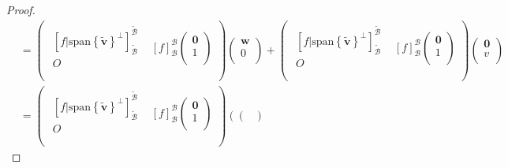 \documentclass[dvipdfmx]{jsarticle}
\begin{document}
\begin{proof}
\begin{align*}
&= \begin{pmatrix}
\begin{matrix}
\left[ f|{{\mathrm{span}}\left\{ \widetilde{\mathbf{v}} \right\}}^{\bot} \right]_{\widetilde{\mathcal{B}}}^{\widetilde{\mathcal{B}}} \\
O \\
\end{matrix} & [ f]_{\mathcal{B}}^{\mathcal{B}}\begin{pmatrix}
\mathbf{0} \\
1 \\
\end{pmatrix} \\
\end{pmatrix}\begin{pmatrix}
\mathbf{w} \\
0 \\
\end{pmatrix} + \begin{pmatrix}
\begin{matrix}
\left[ f|{{\mathrm{span}}\left\{ \widetilde{\mathbf{v}} \right\}}^{\bot} \right]_{\widetilde{\mathcal{B}}}^{\widetilde{\mathcal{B}}} \\
O \\
\end{matrix} & [ f]_{\mathcal{B}}^{\mathcal{B}}\begin{pmatrix}
\mathbf{0} \\
1 \\
\end{pmatrix} \\
\end{pmatrix}\begin{pmatrix}
\mathbf{0} \\
v \\
\end{pmatrix}\\
&= \begin{pmatrix}
\begin{matrix}
\left[ f|{{\mathrm{span}}\left\{ \widetilde{\mathbf{v}} \right\}}^{\bot} \right]_{\widetilde{\mathcal{B}}}^{\widetilde{\mathcal{B}}} \\
O \\
\end{matrix} & [ f]_{\mathcal{B}}^{\mathcal{B}}\begin{pmatrix}
\mathbf{0} \\
1 \\
\end{pmatrix} \\
\end{pmatrix}\left( \begin{pmatrix}

\end{pmatrix}
\end{align*}
\end{proof}
\end{document}
